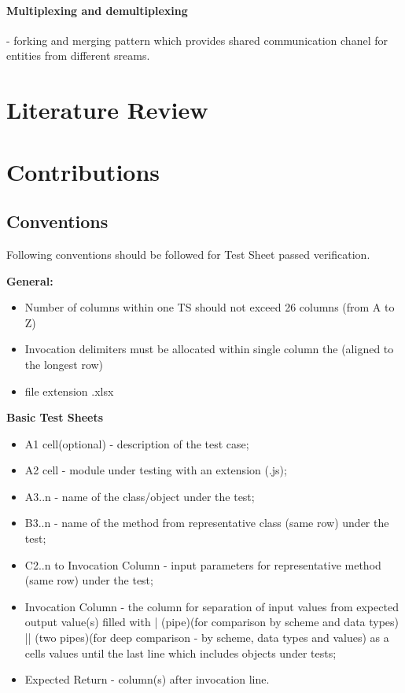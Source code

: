 \documentclass{llncs}
\begin{document}
\paragraph{Multiplexing and demultiplexing} - forking and merging pattern which provides shared communication chanel for entities from different sreams.\cite{nodejsbook}
\cite{nodejsbook}




 


\section{Literature Review}


\section{Contributions}
\label{sec:contributions}

\subsection{Conventions}
\label{sec:conventions}

Following conventions should be followed for Test Sheet passed verification.

\textbf{General:}
\begin{itemize}
\item Number of columns within one TS should not exceed 26 columns (from A to Z)
\item Invocation delimiters must be allocated within single column the (aligned to the longest row)
\item file extension .xlsx\\
\end{itemize}

\textbf{ Basic Test Sheets} 
\begin{itemize}
\item A1 cell(optional) - description of the test case;
\item A2 cell - module under testing with an extension (.js);
\item A3..n - name of the class/object under the test;
\item B3..n - name of the method from representative class (same row) under the test;
\item C2..n to Invocation Column - input parameters for representative method (same row) under the test;
\item Invocation Column - the column for separation of input values from expected output value(s) filled with | (pipe)(for comparison by scheme and data types) || (two pipes)(for deep comparison - by scheme, data types and values) as a cells values until the last line which includes objects under tests;
\item Expected Return - column(s) after invocation line.\\
\end{itemize}
\end{document}
